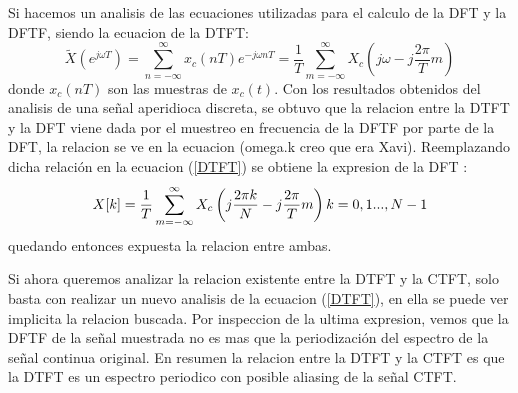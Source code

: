 \documentclass[letterpaper]{article}
\begin{document}
Si hacemos un analisis de las ecuaciones utilizadas para el calculo de la DFT y la DFTF, siendo la ecuacion de la DTFT: 
\begin{equation}
    \label{DTFT}
	\tilde{X}(e^{j \omega T}) = \sum_{n=- \infty}^{\infty} x_{c}(nT) e^{-j \omega nT}=\frac{1}{T}\sum_{m=- \infty}^{\infty} X_{c} \left(j \omega - j \frac{2 \pi}{T}	m \right)	
\end{equation}
 donde $x_{c}(nT)$ son las muestras de $x_{c}(t)$.
 Con los resultados obtenidos del analisis de una señal aperidioca discreta, se obtuvo que la relacion entre la DTFT y la DFT viene dada por el muestreo en frecuencia de la DFTF por parte de la DFT, la relacion
se ve en la ecuacion (omega.k creo que era Xavi). Reemplazando dicha relación en la ecuacion (\ref{DTFT}) se obtiene la expresion de la DFT :
 \begin{equation}
 X[k] = \frac{1}{T}\sum_{m=- \infty}^{\infty} X_{c} \left(j \frac{2 \pi k }{N} - j \frac{2 \pi}{T}	m \right)    k =0,1..., N-1 \\
 \end{equation}
 quedando entonces expuesta la relacion entre ambas.
 
 Si ahora queremos analizar la relacion existente entre la DTFT y la CTFT, solo basta con realizar un nuevo analisis de la ecuacion (\ref{DTFT}), en ella se puede ver implicita la relacion buscada.
 Por inspeccion de la ultima expresion, vemos que la DFTF de la señal muestrada no es mas que la periodización del espectro de la señal continua original.
 En resumen la relacion entre la DTFT y la CTFT es que la DTFT es un espectro periodico con posible aliasing de la señal CTFT.
 
\end{document}
